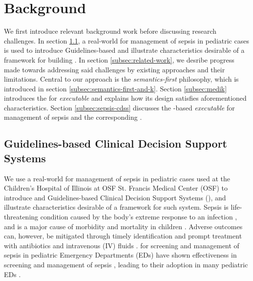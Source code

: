 \section{Background}


We first introduce relevant background work before discussing research challenges.
In section \ref{subsec:cdss}, a real-world \BPG{} for management of sepsis
in pediatric cases is used to introduce Guidelines-based \CDSSs{} and illustrate
characteristics desirable of a framework for building \CDSSs{}.
In section \ref{subsec:related-work}, we desribe progress
made towards addressing said challenges by existing approaches and their limitations.
Central to our approach is the \emph{semantics-first} philosophy,
which is introduced in section \ref{subsec:semantics-first-and-k}.
Section \ref{subsec:medik} introduces the \MediK{} \DSL{} for
\emph{executable} \BPGs{} and explains how its design satisfies aforementioned
characteristics. Section \ref{subsec:sepsis-cdss} discusses the \MediK{}-based
\emph{executable} \BPG{} for management of sepsis and the corresponding \CDSS{}.

\subsection{Guidelines-based Clinical Decision Support Systems}\label{subsec:cdss}

We use a real-world \BPG{} for management of sepsis
in pediatric cases used at the Children's Hospital of Illinois at OSF St.
Francis Medical Center (OSF) to introduce \BPGs{} and Guidelines-based Clinical Decision
Support Systems (\CDSSs{}), and illustrate characteristics desirable of a framework for such system.
Sepsis is life-threatening condition caused by the body's extreme response to
an infection \cite{RhodesICM17}, and is
a major cause of morbidity and mortality in children \cite{Eisenberg2021JP}.
Adverse outcomes can, however, be mitigated through timely
identification and prompt treatment with antibiotics and
intravenous (IV) fluids \cite{Weiss2014CCM,Evans2018JAMA}.
\BPGs{} for screening and management of sepsis in pediatric Emergency
Departments (EDs) have shown effectiveness in screening and management of sepsis \cite{Eisenberg2021JP},
leading to their adoption in many pediatric EDs \cite{Balamuth2017EM,Sepanski2014FP}.

